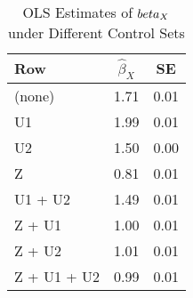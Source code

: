 \begin{table}[ht]
\centering
\begin{tabular}{lcc}
  \toprule
Row & $\hat{\beta}_X$ & SE \\ 
  \midrule
(none) & 1.71 & 0.01 \\ 
  U1 & 1.99 & 0.01 \\ 
  U2 & 1.50 & 0.00 \\ 
  Z & 0.81 & 0.01 \\ 
  U1 + U2 & 1.49 & 0.01 \\ 
  Z + U1 & 1.00 & 0.01 \\ 
  Z + U2 & 1.01 & 0.01 \\ 
  Z + U1 + U2 & 0.99 & 0.01 \\ 
   \bottomrule
\end{tabular}
\caption{OLS Estimates of $\\beta_X$ under Different Control Sets} 
\label{tab:regressions}
\end{table}
